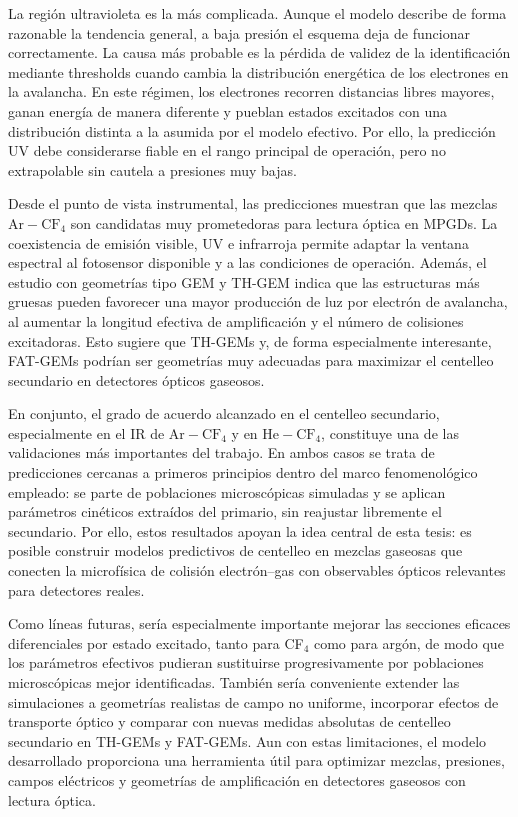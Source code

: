 \documentclass[12pt,a4paper]{article}
\newcommand{\He}{\mathrm{He}}
\newcommand{\Ar}{\mathrm{Ar}}
\newcommand{\CF}{\mathrm{CF}}
\begin{document}
La región ultravioleta es la más complicada. Aunque el modelo describe de forma razonable la tendencia general, a baja presión el esquema deja de funcionar correctamente. La causa más probable es la pérdida de validez de la identificación mediante thresholds cuando cambia la distribución energética de los electrones en la avalancha. En este régimen, los electrones recorren distancias libres mayores, ganan energía de manera diferente y pueblan estados excitados con una distribución distinta a la asumida por el modelo efectivo. Por ello, la predicción UV debe considerarse fiable en el rango principal de operación, pero no extrapolable sin cautela a presiones muy bajas.

Desde el punto de vista instrumental, las predicciones muestran que las mezclas $\Ar-\CF_4$ son candidatas muy prometedoras para lectura óptica en MPGDs. La coexistencia de emisión visible, UV e infrarroja permite adaptar la ventana espectral al fotosensor disponible y a las condiciones de operación. Además, el estudio con geometrías tipo GEM y TH-GEM indica que las estructuras más gruesas pueden favorecer una mayor producción de luz por electrón de avalancha, al aumentar la longitud efectiva de amplificación y el número de colisiones excitadoras. Esto sugiere que TH-GEMs y, de forma especialmente interesante, FAT-GEMs podrían ser geometrías muy adecuadas para maximizar el centelleo secundario en detectores ópticos gaseosos.

En conjunto, el grado de acuerdo alcanzado en el centelleo secundario, especialmente en el IR de $\Ar-\CF_4$ y en $\He-\CF_4$, constituye una de las validaciones más importantes del trabajo. En ambos casos se trata de predicciones cercanas a primeros principios dentro del marco fenomenológico empleado: se parte de poblaciones microscópicas simuladas y se aplican parámetros cinéticos extraídos del primario, sin reajustar libremente el secundario. Por ello, estos resultados apoyan la idea central de esta tesis: es posible construir modelos predictivos de centelleo en mezclas gaseosas que conecten la microfísica de colisión electrón--gas con observables ópticos relevantes para detectores reales.

Como líneas futuras, sería especialmente importante mejorar las secciones eficaces diferenciales por estado excitado, tanto para CF$_4$ como para argón, de modo que los parámetros efectivos pudieran sustituirse progresivamente por poblaciones microscópicas mejor identificadas. También sería conveniente extender las simulaciones a geometrías realistas de campo no uniforme, incorporar efectos de transporte óptico y comparar con nuevas medidas absolutas de centelleo secundario en TH-GEMs y FAT-GEMs. Aun con estas limitaciones, el modelo desarrollado proporciona una herramienta útil para optimizar mezclas, presiones, campos eléctricos y geometrías de amplificación en detectores gaseosos con lectura óptica.



\printbibliography
{}
\end{document}
